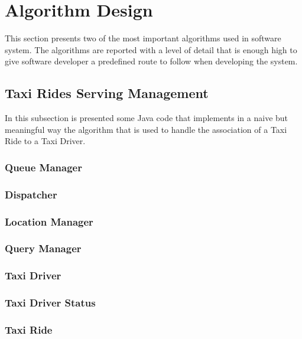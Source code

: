\section{Algorithm Design}

This section presents two of the most important algorithms used in \myTaxiService{} software system.
The algorithms are reported with a level of detail that is enough high to give software developer a predefined route to follow when developing the system.

\subsection{Taxi Rides Serving Management}
In this subsection is presented some Java code that implements in a naive but meaningful way the algorithm that is used to handle the association of a Taxi Ride to a Taxi Driver.
\subsubsection{Queue Manager}
\subsubsection{Dispatcher}
\subsubsection{Location Manager}
\subsubsection{Query Manager}
\subsubsection{Taxi Driver}
\subsubsection{Taxi Driver Status}
\subsubsection{Taxi Ride}
